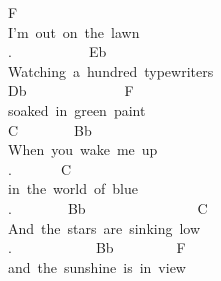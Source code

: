 {F\\
I'm\ out\ on\ the\ lawn\\
.\ \ \ \ \ \ \ \ \ \ \ Eb\\
Watching\ a\ hundred\ typewriters\\
Db\ \ \ \ \ \ \ \ \ \ \ \ \ \ F\\
soaked\ in\ green\ paint\\
C\ \ \ \ \ \ \ \ Bb\\
When\ you\ wake\ me\ up\\
.\ \ \ \ \ \ \ C\\
in\ the\ world\ of\ blue\\
.\ \ \ \ \ \ \ \ Bb\ \ \ \ \ \ \ \ \ \ \ \ \ \ \ \ C\\
And\ the\ stars\ are\ sinking\ low\\
.\ \ \ \ \ \ \ \ \ \ \ \ Bb\ \ \ \ \ \ \ \ \ F\\
and\ the\ sunshine\ is\ in\ view}
